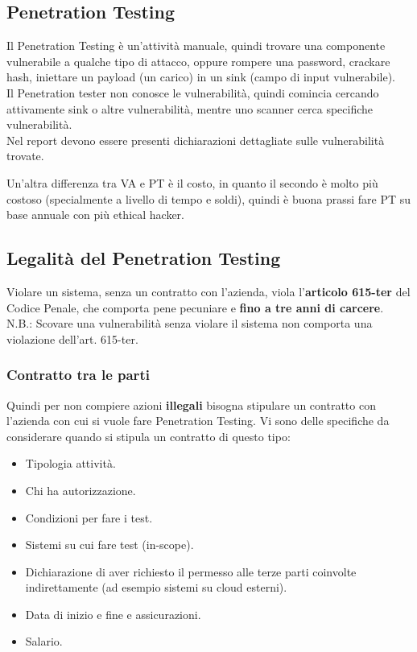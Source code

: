 \documentclass{article}
\begin{document}
\subsection{Penetration Testing}
Il Penetration Testing è un'attività manuale, quindi trovare una componente vulnerabile a qualche tipo di attacco, oppure rompere una password, crackare hash, iniettare un payload (un carico) in un sink (campo di input vulnerabile).\\
Il Penetration tester non conosce le vulnerabilità, quindi comincia cercando attivamente sink o altre vulnerabilità, mentre uno scanner cerca specifiche vulnerabilità.\\
Nel report devono essere presenti dichiarazioni dettagliate sulle vulnerabilità trovate.

Un'altra differenza tra VA e PT è il costo, in quanto il secondo è molto più costoso (specialmente a livello di tempo e soldi), quindi è buona prassi fare PT su base annuale con più ethical hacker.

\subsection{Legalità del Penetration Testing}
Violare un sistema, senza un contratto con l'azienda, viola l'\textbf{articolo 615-ter} del Codice Penale, che comporta pene pecuniare e \textbf{fino a tre anni di carcere}.\\
N.B.: Scovare una vulnerabilità senza violare il sistema non comporta una violazione dell'art. 615-ter.

\subsubsection{Contratto tra le parti}
Quindi per non compiere azioni \textbf{illegali} bisogna stipulare un contratto con l'azienda con cui si vuole fare Penetration Testing. Vi sono delle specifiche da considerare quando si stipula un contratto di questo tipo:
\begin{itemize}
    \item Tipologia attività.
    \item Chi ha autorizzazione.
    \item Condizioni per fare i test.
    \item Sistemi su cui fare test (in-scope).
    \item Dichiarazione di aver richiesto il permesso alle terze parti coinvolte indirettamente (ad esempio sistemi su cloud esterni).
    \item Data di inizio e fine e assicurazioni.
    \item Salario.
\end{itemize}
\end{document}
